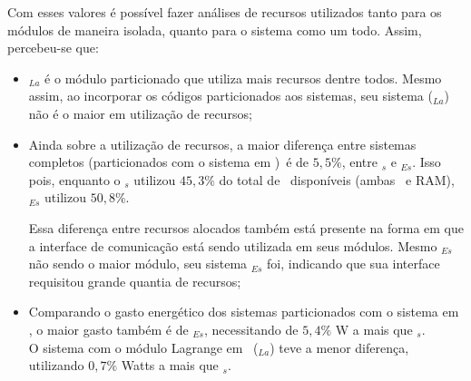         Com esses valores é possível fazer análises de recursos utilizados tanto para os módulos de maneira isolada, quanto para o sistema como um todo.
        Assim, percebeu-se que:


        
        \begin{itemize}
            \item 
            \A$_{La}$ é o módulo particionado que utiliza mais recursos dentre todos.
            Mesmo assim, ao incorporar os códigos particionados aos sistemas, seu sistema (\Ss$_{La}$) não é o maior em utilização de recursos;
            
            \item
            Ainda sobre a utilização de recursos, a maior diferença entre sistemas completos (particionados com o sistema em \software)\ é de $5,5\%$, entre \Ss$_{s}$ e \Ss$_{Es}$. 
            Isso pois, enquanto o \Ss$_{s}$ utilizou $45,3\%$ do total de \luts\ disponíveis (ambas \luts\ e \luts RAM), \Ss$_{Es}$ utilizou $50,8\%$.
            
            Essa diferença entre recursos alocados também está presente na forma em que a interface de comunicação está sendo utilizada em seus módulos.
            Mesmo \A$_{Es}$ não sendo o maior módulo, seu sistema \Ss$_{Es}$ foi, indicando que sua interface requisitou grande quantia de recursos;
            
            \item
            Comparando o gasto energético dos sistemas particionados com o sistema em \software, o maior gasto também é de \Ss$_{Es}$, necessitando de $5,4\%$ W a mais que \Ss$_{s}$. \\
            O sistema com o módulo Lagrange em \hardware\ (\Ss$_{La}$) teve a menor diferença, utilizando $0,7\%$ Watts a mais que \Ss$_{s}$.
        \end{itemize}
           
           

